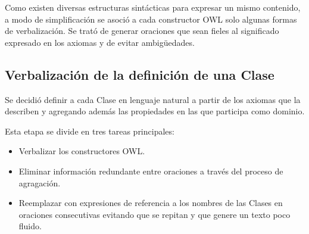 Como existen diversas estructuras sintácticas para expresar un mismo contenido, a modo de simplificación se asoció a cada constructor OWL solo algunas formas de verbalización. Se trató de generar oraciones que sean fieles al significado expresado en los axiomas y de evitar ambigüedades.

\subsection{Verbalización de la definición de una Clase}
Se decidió definir a cada Clase en lenguaje natural a partir de los axiomas que la describen y agregando además las propiedades en las que participa como dominio.

Esta etapa se divide en tres tareas principales:
\begin{itemize}
    \item Verbalizar los constructores OWL.
    \item Eliminar información redundante entre oraciones a través del proceso de agragación.
    \item Reemplazar con expresiones de referencia a los nombres de las Clases en oraciones consecutivas evitando que se repitan y que genere un texto poco fluido.
\end{itemize}

